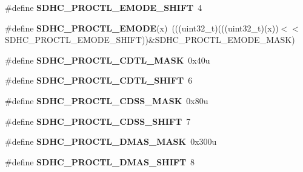 \begin{DoxyCompactItemize}
\item 
\#define {\bfseries S\+D\+H\+C\+\_\+\+P\+R\+O\+C\+T\+L\+\_\+\+E\+M\+O\+D\+E\+\_\+\+S\+H\+I\+FT}~4\hypertarget{group__SDHC__Register__Masks_gaf41ed2806a975210d570ee34cfe81630}{}\label{group__SDHC__Register__Masks_gaf41ed2806a975210d570ee34cfe81630}

\item 
\#define {\bfseries S\+D\+H\+C\+\_\+\+P\+R\+O\+C\+T\+L\+\_\+\+E\+M\+O\+DE}(x)~(((uint32\+\_\+t)(((uint32\+\_\+t)(x))$<$$<$S\+D\+H\+C\+\_\+\+P\+R\+O\+C\+T\+L\+\_\+\+E\+M\+O\+D\+E\+\_\+\+S\+H\+I\+FT))\&S\+D\+H\+C\+\_\+\+P\+R\+O\+C\+T\+L\+\_\+\+E\+M\+O\+D\+E\+\_\+\+M\+A\+SK)\hypertarget{group__SDHC__Register__Masks_ga1c3a2c1c26d5ef0ddb1b54d3ef90fd46}{}\label{group__SDHC__Register__Masks_ga1c3a2c1c26d5ef0ddb1b54d3ef90fd46}

\item 
\#define {\bfseries S\+D\+H\+C\+\_\+\+P\+R\+O\+C\+T\+L\+\_\+\+C\+D\+T\+L\+\_\+\+M\+A\+SK}~0x40u\hypertarget{group__SDHC__Register__Masks_ga8af505ec10166a4196541f055cad8907}{}\label{group__SDHC__Register__Masks_ga8af505ec10166a4196541f055cad8907}

\item 
\#define {\bfseries S\+D\+H\+C\+\_\+\+P\+R\+O\+C\+T\+L\+\_\+\+C\+D\+T\+L\+\_\+\+S\+H\+I\+FT}~6\hypertarget{group__SDHC__Register__Masks_ga84652338a2704314d7ab2381a351215c}{}\label{group__SDHC__Register__Masks_ga84652338a2704314d7ab2381a351215c}

\item 
\#define {\bfseries S\+D\+H\+C\+\_\+\+P\+R\+O\+C\+T\+L\+\_\+\+C\+D\+S\+S\+\_\+\+M\+A\+SK}~0x80u\hypertarget{group__SDHC__Register__Masks_ga4eacd6fff47090ff277ac702744032c7}{}\label{group__SDHC__Register__Masks_ga4eacd6fff47090ff277ac702744032c7}

\item 
\#define {\bfseries S\+D\+H\+C\+\_\+\+P\+R\+O\+C\+T\+L\+\_\+\+C\+D\+S\+S\+\_\+\+S\+H\+I\+FT}~7\hypertarget{group__SDHC__Register__Masks_ga9c25c726f9cf08d6cf3dc9dd8b56f02f}{}\label{group__SDHC__Register__Masks_ga9c25c726f9cf08d6cf3dc9dd8b56f02f}

\item 
\#define {\bfseries S\+D\+H\+C\+\_\+\+P\+R\+O\+C\+T\+L\+\_\+\+D\+M\+A\+S\+\_\+\+M\+A\+SK}~0x300u\hypertarget{group__SDHC__Register__Masks_ga100c5b53357ad23fabd0976fbac43ff4}{}\label{group__SDHC__Register__Masks_ga100c5b53357ad23fabd0976fbac43ff4}

\item 
\#define {\bfseries S\+D\+H\+C\+\_\+\+P\+R\+O\+C\+T\+L\+\_\+\+D\+M\+A\+S\+\_\+\+S\+H\+I\+FT}~8\hypertarget{group__SDHC__Register__Masks_ga934c05067b80924d6afa525d338e7529}{}\label{group__SDHC__Register__Masks_ga934c05067b80924d6afa525d338e7529}


\end{DoxyCompactItemize}

